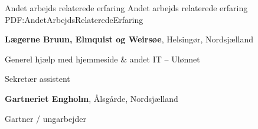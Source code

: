 

\Section
{Andet arbejds relaterede erfaring}
{Andet arbejds relaterede erfaring}
{PDF:AndetArbejdsRelateredeErfaring}

\Entry
\textbf{Lægerne Bruun, Elmquist og Weirsøe},
Helsingør, Nordsjælland

\Gap
\BulletItem
Generel hjælp med hjemmeside \& 
andet IT
\hfill
{} -- 
\SubBulletItem
Ulønnet


\Gap
\BulletItem
Sekretær assistent
\hfill
{}


\BigGap
\Entry
\textbf{Gartneriet Engholm},
Ålsgårde, Nordsjælland

\Gap
\BulletItem
Gartner / ungarbejder
\hfill
{}
